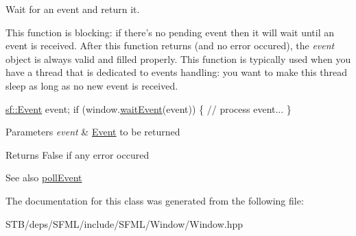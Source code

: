 Wait for an event and return it. 

This function is blocking\+: if there's no pending event then it will wait until an event is received. After this function returns (and no error occured), the {\itshape event} object is always valid and filled properly. This function is typically used when you have a thread that is dedicated to events handling\+: you want to make this thread sleep as long as no new event is received. 
\begin{DoxyCode}
\hyperlink{classsf_1_1_event}{sf::Event} event;
\textcolor{keywordflow}{if} (window.\hyperlink{classsf_1_1_window_aaf02ab64fbc1d374eef3696df54137bc}{waitEvent}(event))
\{
   \textcolor{comment}{// process event...}
\}
\end{DoxyCode}



\begin{DoxyParams}{Parameters}
{\em event} & \hyperlink{classsf_1_1_event}{Event} to be returned\\
\hline
\end{DoxyParams}
\begin{DoxyReturn}{Returns}
False if any error occured
\end{DoxyReturn}
\begin{DoxySeeAlso}{See also}
\hyperlink{classsf_1_1_window_a338e996585faf82e93069858e3b531b7}{poll\+Event} 
\end{DoxySeeAlso}


The documentation for this class was generated from the following file\+:\begin{DoxyCompactItemize}
\item 
S\+T\+B/deps/\+S\+F\+M\+L/include/\+S\+F\+M\+L/\+Window/Window.\+hpp\end{DoxyCompactItemize}
